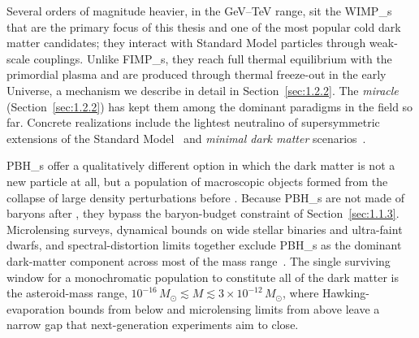 Several orders of magnitude heavier, in the GeV--TeV range, sit the \glspl{WIMP_} that are the primary focus of this thesis and one of the most popular cold dark matter candidates; they interact with Standard Model particles through weak-scale couplings.
Unlike \glspl{FIMP_}, they reach full thermal equilibrium with the primordial plasma and are produced through thermal freeze-out in the early Universe, a mechanism we describe in detail in Section~\ref{sec:1.2.2}.
The \emph{\WIMP miracle} (Section~\ref{sec:1.2.2}) has kept them among the dominant paradigms in the field so far.
Concrete realizations include the lightest neutralino of supersymmetric extensions of the Standard Model~\cite{Ellis:1983ew} and \emph{minimal dark matter} scenarios~\cite{Cirelli:2005uq}.

\Glspl{PBH_} offer a qualitatively different option in which the dark matter is not a new particle at all, but a population of macroscopic objects formed from the collapse of large density perturbations before \BBN.
Because \glspl{PBH_} are not made of baryons after \BBN, they bypass the baryon-budget constraint of Section~\ref{sec:1.1.3}.
Microlensing surveys, dynamical bounds on wide stellar binaries and ultra-faint dwarfs, and \CMB spectral-distortion limits together exclude \glspl{PBH_} as the dominant dark-matter component across most of the mass range~\cite{Carr:2020xqk, bradley_j_kavanagh_2019_3538999}.
The single surviving window for a monochromatic \PBH population to constitute all of the dark matter is the asteroid-mass range, $10^{-16}\,M_\odot \lesssim M \lesssim 3 \times 10^{-12}\,M_\odot$, where Hawking-evaporation bounds from below and microlensing limits from above leave a narrow gap that next-generation experiments aim to close. 

